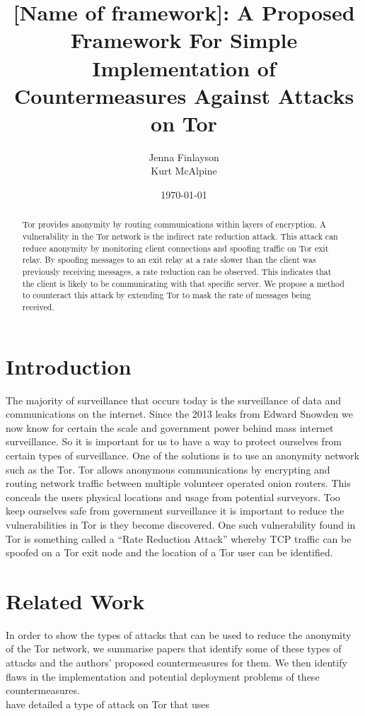 \documentclass[9pt,technote]{IEEEtran}
\title{[Name of framework]: A Proposed Framework For Simple Implementation of Countermeasures Against Attacks on Tor}
\date{\today}
\author{Jenna Finlayson\\Kurt McAlpine}
\begin{document}
\maketitle

\begin{abstract}
Tor provides anonymity by routing communications within layers of encryption. A
vulnerability in the Tor network is the indirect rate reduction attack. This
attack can reduce anonymity by monitoring client connections and spoofing
traffic on Tor exit relay. By spoofing messages to an exit relay at a rate
slower than the client was previously receiving messages, a rate reduction can
be observed. This indicates that the client is likely to be communicating with
that specific server. We propose a method to counteract this attack by
extending Tor to mask the rate of messages being received.
\end{abstract}

\section{Introduction}

The majority of surveillance that occurs today is the surveillance of data and
communications on the internet\cite{diffie2008brave}. Since the 2013 leaks from
Edward Snowden we now know for certain the scale and government power behind
mass internet surveillance. So it is important for us to have a way to protect
ourselves from certain types of surveillance. One of the solutions is to use an
anonymity network such as the Tor. Tor allows anonymous communications by
encrypting and routing network traffic between multiple volunteer operated
onion routers. This conceals the users physical locations and usage from
potential surveyors. Too keep ourselves safe from government surveillance it is
important to reduce the vulnerabilities in Tor is they become discovered. One
such vulnerability found in Tor is something called a ``Rate Reduction Attack''
whereby TCP traffic can be spoofed on a Tor exit node and the location of a Tor
user can be identified\cite{gilad2012spying}.

\cite{hayesguard}\cite{gilad2012spying}\cite{sun2015raptor}\cite{biryukov2012torscan}\cite{jansen2014sniper}

\section{Related Work}
In order to show the types of attacks that can be used to reduce the anonymity of the Tor network, we summarise papers that identify some of these types of attacks and the authors' proposed countermeasures for them. We then identify flaws in the implementation and potential deployment problems of these countermeasures.\\

\citeauthor{gilad2012spying} have detailed a type of attack on Tor that uses




\end{document}
